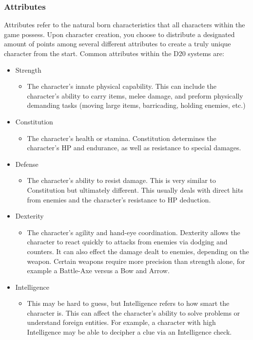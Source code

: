 \documentclass[12pt,a4paper]{report}
\begin{document}
			\subsubsection{Attributes}
			Attributes refer to the natural born characteristics that all characters within the game possess. Upon character creation, you choose to distribute a designated amount of points among several different attributes to create a truly unique character from the start. 
			Common attributes within the D20 systems are:
			\begin{itemize}
				\item Strength
					\begin{itemize}
						\item The character's innate physical capability. This can include the character's ability to carry items, melee damage, and preform physically demanding tasks (moving large items, barricading, holding enemies, etc.)
					\end{itemize}
				\item Constitution
					\begin{itemize}
						\item The character's health or stamina. Constitution determines the character's HP and endurance, as well as resistance to special damages. 
					\end{itemize}
				\item Defense
					\begin{itemize}
						\item The character's ability to resist damage. This is very similar to Constitution but ultimately different. This usually deals with direct hits from enemies and the character's resistance to HP deduction.
					\end{itemize}
				\item Dexterity
					\begin{itemize}
						\item The character's agility and hand-eye coordination. Dexterity allows the character to react quickly to attacks from enemies via dodging and counters. It can also effect the damage dealt to enemies, depending on the weapon. Certain weapons require more precision than strength alone, for example a Battle-Axe versus a Bow and Arrow.
					\end{itemize}
				\item Intelligence
					\begin{itemize}
						\item This may be hard to guess, but Intelligence refers to how smart the character is. This can affect the character's ability to solve problems or understand foreign entities. For example, a character with high Intelligence may be able to decipher a clue via an Intelligence check.

\end{itemize}
\end{itemize}
\end{document}
